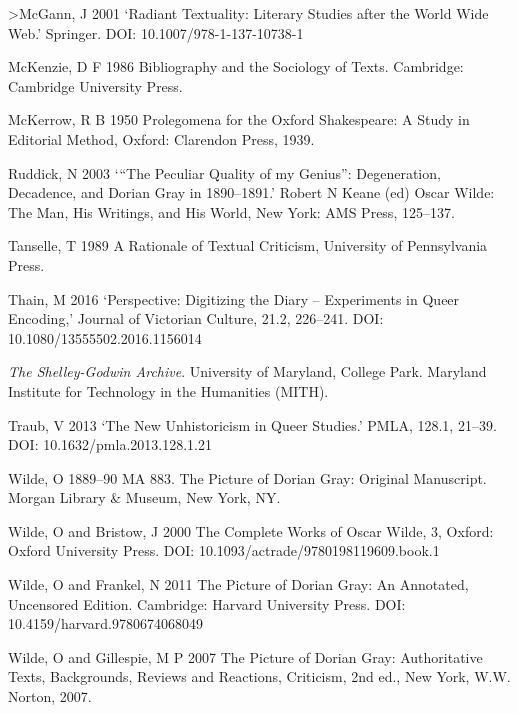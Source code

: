 \documentclass[11pt]{article}
\begin{document}
>McGann, J 2001 ‘Radiant Textuality: Literary Studies after the
World Wide Web.' Springer. DOI: 10.1007/978-1-137-10738-1

McKenzie, D F 1986 Bibliography and the Sociology of Texts.
Cambridge: Cambridge University Press.

McKerrow, R B 1950 Prolegomena for the Oxford Shakespeare: A
Study in Editorial Method, Oxford: Clarendon Press, 1939.

Ruddick, N 2003 ‘“The Peculiar Quality of my Genius”:
Degeneration, Decadence, and Dorian Gray in 1890--1891.' Robert N Keane
(ed) Oscar Wilde: The Man, His Writings, and His World, New York: AMS
Press, 125--137.

Tanselle, T 1989 A Rationale of Textual Criticism, University
of Pennsylvania Press.

Thain, M 2016 ‘Perspective: Digitizing the Diary --
Experiments in Queer Encoding,' Journal of Victorian Culture, 21.2,
226--241. DOI: 10.1080/13555502.2016.1156014

\emph{The Shelley-Godwin Archive}. University of Maryland, College
Park. Maryland Institute for Technology in the Humanities (MITH).

Traub, V 2013 ‘The New Unhistoricism in Queer Studies.' PMLA,
128.1, 21--39. DOI: 10.1632/pmla.2013.128.1.21

Wilde, O 1889--90 MA 883. The Picture of Dorian Gray:
Original Manuscript. Morgan Library \& Museum, New York, NY.

Wilde, O and Bristow, J 2000 The Complete Works of Oscar
Wilde, 3, Oxford: Oxford University Press. DOI:
10.1093/actrade/9780198119609.book.1

Wilde, O and Frankel, N 2011 The Picture of Dorian Gray: An
Annotated, Uncensored Edition. Cambridge: Harvard University Press. DOI:
10.4159/harvard.9780674068049

Wilde, O and Gillespie, M P 2007 The Picture of Dorian Gray:
Authoritative Texts, Backgrounds, Reviews and Reactions, Criticism, 2nd
ed., New York, W.W. Norton, 2007.
\end{document}
